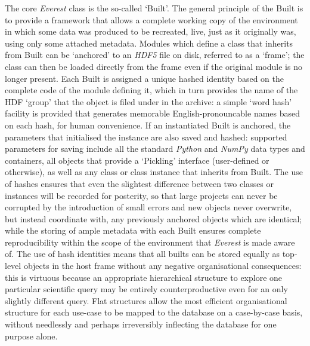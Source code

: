 \documentclass[a4paper,11pt,oneside]{book}
\begin{document}
The core \textit{Everest} class is the so-called `Built'. The general principle of the Built is to provide a framework that allows a complete working copy of the environment in which some data was produced to be recreated, live, just as it originally was, using only some attached metadata. Modules which define a class that inherits from Built can be `anchored' to an \textit{HDF5} file on disk, referred to as a `frame'; the class can then be loaded directly from the frame even if the original module is no longer present. Each Built is assigned a unique hashed identity based on the complete code of the module defining it, which in turn provides the name of the HDF `group' that the object is filed under in the archive: a simple `word hash' facility is provided that generates memorable English-pronouncable names based on each hash, for human convenience. If an instantiated Built is anchored, the parameters that initialised the instance are also saved and hashed: supported parameters for saving include all the standard \textit{Python} and \textit{NumPy} data types and containers, all objects that provide a `Pickling' interface (user-defined or otherwise), as well as any class or class instance that inherits from Built. The use of hashes ensures that even the slightest difference between two classes or instances will be recorded for posterity, so that large projects can never be corrupted by the introduction of small errors and new objects never overwrite, but instead coordinate with, any previously anchored objects which are identical; while the storing of ample metadata with each Built ensures complete reproducibility within the scope of the environment that \textit{Everest} is made aware of. The use of hash identities means that all builts can be stored equally as top-level objects in the host frame without any negative organisational consequences: this is virtuous because an appropriate hierarchical structure to explore one particular scientific query may be entirely counterproductive even for an only slightly different query. Flat structures allow the most efficient organisational structure for each use-case to be mapped to the database on a case-by-case basis, without needlessly and perhaps irreversibly inflecting the database for one purpose alone.
\end{document}

